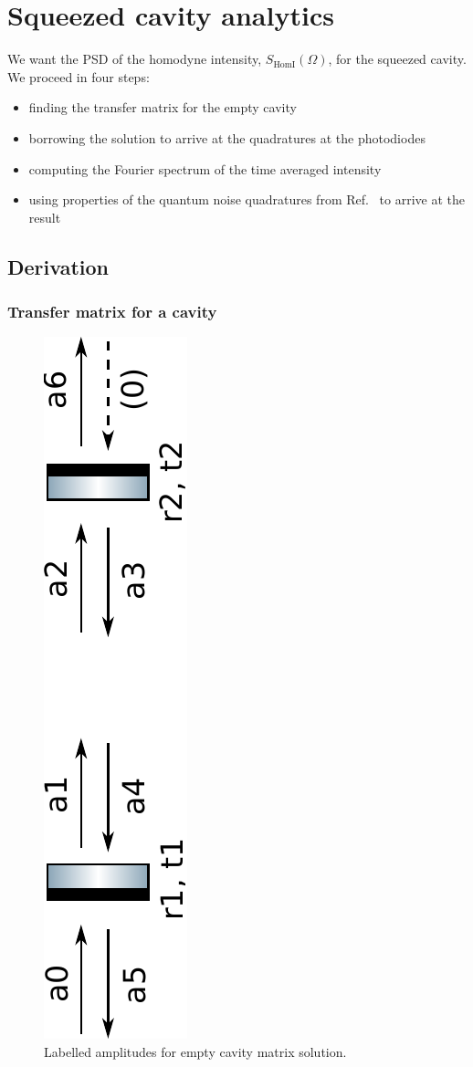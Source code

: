 \documentclass[aps,pra,superscriptaddress,reprint,nofootinbib]{revtex4-1}
\begin{document}
\appendix
\section{Squeezed cavity analytics}
\label{app:squeezed_cavity_analytics}

We want the PSD of the homodyne intensity, $S_{\mathrm{HomI}}(\Omega)$, for the squeezed cavity. We proceed in four steps:
\begin{itemize}
\item finding the transfer matrix for the empty cavity
\item borrowing the solution to arrive at the quadratures at the photodiodes
\item computing the Fourier spectrum of the time averaged intensity
\item using properties of the quantum noise quadratures from Ref.~\cite{Danilishin_2012} to arrive at the result
\end{itemize}

\subsection{Derivation}

\subsubsection{Transfer matrix for a cavity}

\begin{figure}
	\begin{center}
	\includegraphics[height=0.4\textwidth, angle=-90]{figures/empty_cavity_amplitudes.pdf}
	\end{center}
	\caption{Labelled amplitudes for empty cavity matrix solution.}
	\label{fig:empty_cavity_amplitudes}
\end{figure}
\end{document}
